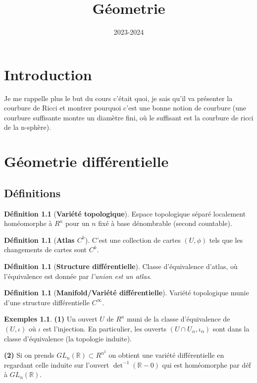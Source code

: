 \documentclass[a4paper,12pt]{book}
\title{Géometrie}
\date{2023-2024}
\newcommand{\R}{\mathbb{R}}
\theoremstyle{plain}
\theoremstyle{definition}
\newtheorem{defn}[subsection]{Définition}
\newtheorem{exs}[subsection]{Exemples}
\theoremstyle{remark}
\begin{document}
\maketitle
\tableofcontents
\chapter*{Introduction}
Je me rappelle plus le but du cours c'était quoi, je sais qu'il
va présenter la courbure de Ricci et montrer pourquoi c'est une 
bonne notion de courbure (une courbure suffisante montre un diamètre fini,
où le suffisant est la courbure de ricci de la n-sphère).

\chapter{Géometrie différentielle}
\section{Définitions}
\begin{defn}[\textbf{Variété topologique}]
    Espace topologique séparé localement homéomorphe à $R^n$ pour un $n$
    fixé à base dénombrable (second countable).
\end{defn}
\begin{defn}[\textbf{Atlas $C^k$}]
    C'est une collection de cartes $(U,\phi)$ tels que
    les changements de cartes sont $C^k$.
\end{defn}
\begin{defn}[\textbf{Structure différentielle}]
    Classe d'équivalence d'atlas, où l'équivalence est donnée par 
    \textit{l'union est un atlas}.
\end{defn}
\begin{defn}[\textbf{Manifold/Variété différentielle}]
    Variété topologique munie d'une structure différentielle $C^{\infty}$.
\end{defn}

\begin{exs}
    \textbf{(1)} Un ouvert $U$ de $R^n$ muni de la classe d'équivalence 
    de $(U,\iota)$ où $\iota$ est l'injection. En particulier, 
    les ouverts $(U\cap U_{\alpha}, \iota_{\alpha})$ sont dans la classe
    d'équivalence (la topologie induite).

    \textbf{(2)} Si on prends $GL_n(\R)\subset R^{n^2}$ on obtient 
    une variété différentielle en regardant celle induite sur l'ouvert
    $\det^{-1}(\R-0)$ qui est homéomorphe par déf à $GL_n(\R)$.
\end{exs}
\end{document}
